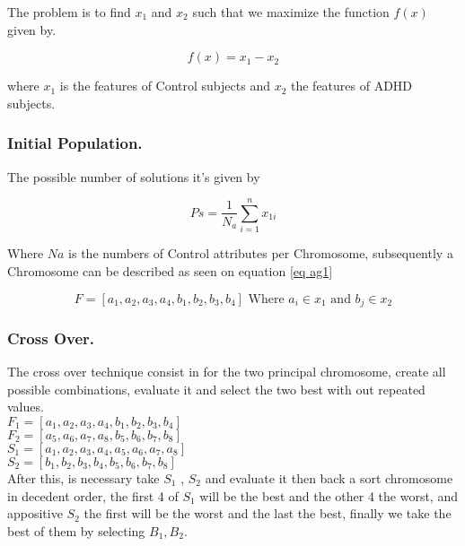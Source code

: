 \documentclass[letterpaper,12pt,openright,oneside]{article}
\begin{document}
The problem is to find $x_1$ and $x_2$ such that we maximize the function $f(x)$ given by.

\begin{equation}
f(x) = x_1 - x_2
\end{equation}

where $x_1$ is the features of Control subjects and $x_2$ the features of ADHD subjects. 

\subsubsection{Initial Population.}
The possible number of solutions it’s given by 

\begin{equation}
Ps = \frac{1}{N_a} \sum_{i=1}^n x_{1i}
\end{equation}

Where $Na$ is the numbers of Control attributes per Chromosome, subsequently a Chromosome can be described as seen on equation \ref{eq ag1}

\begin{equation}\label{eq ag1}
F = [a_1,a_2,a_3,a_4,b_1,b_2,b_3,b_4] \text{ Where } a_i \in  x_1 \text{ and } b_j \in  x_2
\end{equation}

\subsubsection{Cross Over.}
The cross over technique consist in for the two principal chromosome, create all possible combinations, evaluate it  and select the two best with out repeated values.\\


$F_1 = [a_1,a_2,a_3,a_4,b_1,b_2,b_3,b_4]$ \\

$F_2 = [a_5,a_6,a_7,a_8,b_5,b_6,b_7,b_8]$ \\

$S_1 = [a_1,a_2,a_3,a_4,a_5,a_6,a_7,a_8]$\\

$S_2 = [b_1,b_2,b_3,b_4,b_5,b_6,b_7,b_8]$\\


After this, is necessary take $S_1$ , $S_2$ and  evaluate it then back a sort chromosome in decedent order, the first 4 of $S_1$ will be the best and the other 4 the worst, and appositive $S_2$ the first will be the worst and the  last the best, finally we take the best of them by selecting $B_1 , B_2$. 
\end{document}
